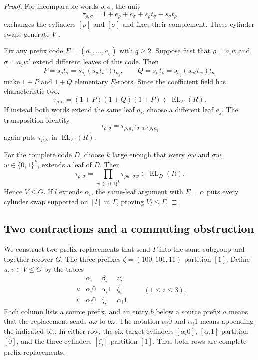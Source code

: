 \documentclass[10pt]{article}
\newcommand{\EL}{\operatorname{EL}}
\begin{document}
\begin{proof}
For incomparable words $\rho,\sigma$, the unit
\[
\tau_{\rho,\sigma}=1+e_\rho+e_\sigma+s_\rho t_\sigma+s_\sigma t_\rho
\]
exchanges the cylinders $[\rho]$ and $[\sigma]$ and fixes their complement. These cylinder swaps generate $V$ \cite[Theorem~1.1]{BQ17}.

Fix any prefix code $E=(a_1,\ldots,a_q)$ with $q\geq2$. Suppose first that $\rho=a_iw$ and $\sigma=a_jw'$ extend different leaves of this code. Then
\[
P=s_\rho t_\sigma=s_{a_i}(s_wt_{w'})t_{a_j},\qquad
Q=s_\sigma t_\rho=s_{a_j}(s_{w'}t_w)t_{a_i}
\]
make $1+P$ and $1+Q$ elementary $E$-roots. Since the coefficient field has characteristic two,
\[
\tau_{\rho,\sigma}=(1+P)(1+Q)(1+P)\in\EL_E(R).
\]
If instead both words extend the same leaf $a_i$, choose a different leaf $a_j$. The transposition identity
\[
\tau_{\rho,\sigma}=\tau_{\rho,a_j}\tau_{\sigma,a_j}\tau_{\rho,a_j}
\]
again puts $\tau_{\rho,\sigma}$ in $\EL_E(R)$.

For the complete code $D$, choose $k$ large enough that every $\rho w$ and $\sigma w$, $w\in\{0,1\}^k$, extends a leaf of $D$. Then
\[
\tau_{\rho,\sigma}=\prod_{w\in\{0,1\}^k}\tau_{\rho w,\sigma w}\in\EL_D(R).
\]
Hence $V\leq G$. If $l$ extends $\alpha_i$, the same-leaf argument with $E=\alpha$ puts every cylinder swap supported on $[l]$ in $\Gamma$, proving $V_l\leq\Gamma$.
\end{proof}

\subsection{Two contractions and a commuting obstruction}
We construct two prefix replacements that send $\Gamma$ into the same subgroup and together recover $G$. The three prefixes $\zeta=(100,101,11)$ partition $[1]$. Define $u,v\in V\leq G$ by the tables
\begin{equation}
\begin{array}{c|ccc}
&\alpha_i&\beta_i&\nu_i\\ \hline
u&\alpha_i0&\alpha_i1&\zeta_i\\
v&\alpha_i0&\zeta_i&\alpha_i1
\end{array}
\qquad(1\leq i\leq3).
\tag{16}
\end{equation}
Each column lists a source prefix, and an entry $b$ below a source prefix $a$ means that the replacement sends $a\omega$ to $b\omega$. The notation $\alpha_i0$ and $\alpha_i1$ means appending the indicated bit. In either row, the six target cylinders $[\alpha_i0]$, $[\alpha_i1]$ partition $[0]$, and the three cylinders $[\zeta_i]$ partition $[1]$. Thus both rows are complete prefix replacements.
\end{document}
